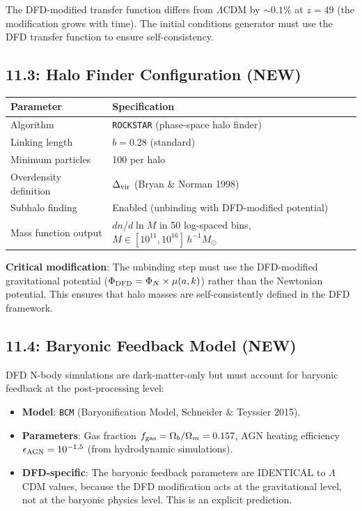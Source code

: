 \documentclass[11pt,a4paper]{article}
\begin{document}
The DFD-modified transfer function differs from $\Lambda$CDM by $\sim 0.1\%$ at $z = 49$ (the modification grows with time). The initial conditions generator must use the DFD transfer function to ensure self-consistency.

\subsection{11.3: Halo Finder Configuration (NEW)}

\begin{center}
\begin{tabular}{ll}
\toprule
\textbf{Parameter} & \textbf{Specification} \\
\midrule
Algorithm & \texttt{ROCKSTAR} (phase-space halo finder) \\
Linking length & $b = 0.28$ (standard) \\
Minimum particles & 100 per halo \\
Overdensity definition & $\Delta_{\rm vir}$ (Bryan \& Norman 1998) \\
Subhalo finding & Enabled (unbinding with DFD-modified potential) \\
Mass function output & $dn/d\ln M$ in 50 log-spaced bins, $M \in [10^{11}, 10^{16}]\,h^{-1}M_\odot$ \\
\bottomrule
\end{tabular}
\end{center}

\textbf{Critical modification}: The unbinding step must use the DFD-modified gravitational potential ($\Phi_{\rm DFD} = \Phi_N \times \mu(a,k)$) rather than the Newtonian potential. This ensures that halo masses are self-consistently defined in the DFD framework.

\subsection{11.4: Baryonic Feedback Model (NEW)}

DFD N-body simulations are dark-matter-only but must account for baryonic feedback at the post-processing level:
\begin{itemize}
\item \textbf{Model}: \texttt{BCM} (Baryonification Model, Schneider \& Teyssier 2015).
\item \textbf{Parameters}: Gas fraction $f_{\rm gas} = \Omega_b/\Omega_m = 0.157$, AGN heating efficiency $\epsilon_{\rm AGN} = 10^{-1.5}$ (from hydrodynamic simulations).
\item \textbf{DFD-specific}: The baryonic feedback parameters are IDENTICAL to $\Lambda$CDM values, because the DFD modification acts at the gravitational level, not at the baryonic physics level. This is an explicit prediction.
\end{itemize}
\end{document}
